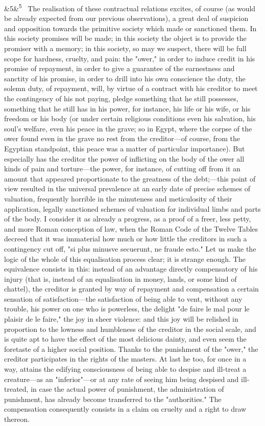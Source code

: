 \documentclass[12pt]{article}
\newcommand{\para}[1][]{\par\noindent\ifx&#1&\else\textsuperscript{\footnotesize #1}~\fi}
\begin{document}
\para[5] The realisation of these contractual relations excites, of course (as would be already expected from our previous observations), a great deal of suspicion and opposition towards the primitive society which made or sanctioned them. In this society promises will be made; in this society the object is to provide the promiser with a memory; in this society, so may we suspect, there will be full scope for hardness, cruelty, and pain: the "ower," in order to induce credit in his promise of repayment, in order to give a guarantee of the earnestness and sanctity of his promise, in order to drill into his own conscience the duty, the solemn duty, of repayment, will, by virtue of a contract with his creditor to meet the contingency of his not paying, pledge something that he still possesses, something that he still has in his power, for instance, his life or his wife, or his freedom or his body (or under certain religious conditions even his salvation, his soul's welfare, even his peace in the grave; so in Egypt, where the corpse of the ower found even in the grave no rest from the creditor---of course, from the Egyptian standpoint, this peace was a matter of particular importance). But especially has the creditor the power of inflicting on the body of the ower all kinds of pain and torture---the power, for instance, of cutting off from it an amount that appeared proportionate to the greatness of the debt;---this point of view resulted in the universal prevalence at an early date of precise schemes of valuation, frequently horrible in the minuteness and meticulosity of their application, legally sanctioned schemes of valuation for individual limbs and parts of the body. I consider it as already a progress, as a proof of a freer, less petty, and more Roman conception of law, when the Roman Code of the Twelve Tables decreed that it was immaterial how much or how little the creditors in such a contingency cut off, "si plus minusve secuerunt, ne fraude esto." Let us make the logic of the whole of this equalisation process clear; it is strange enough. The equivalence consists in this: instead of an advantage directly compensatory of his injury (that is, instead of an equalisation in money, lands, or some kind of chattel), the creditor is granted by way of repayment and compensation a certain sensation of satisfaction---the satisfaction of being able to vent, without any trouble, his power on one who is powerless, the delight "de faire le mal pour le plaisir de le faire," the joy in sheer violence: and this joy will be relished in proportion to the lowness and humbleness of the creditor in the social scale, and is quite apt to have the effect of the most delicious dainty, and even seem the foretaste of a higher social position. Thanks to the punishment of the "ower," the creditor participates in the rights of the masters. At last he too, for once in a way, attains the edifying consciousness of being able to despise and ill-treat a creature---as an "inferior"---or at any rate of seeing him being despised and ill-treated, in case the actual power of punishment, the administration of punishment, has already become transferred to the "authorities." The compensation consequently consists in a claim on cruelty and a right to draw thereon.
\end{document}
